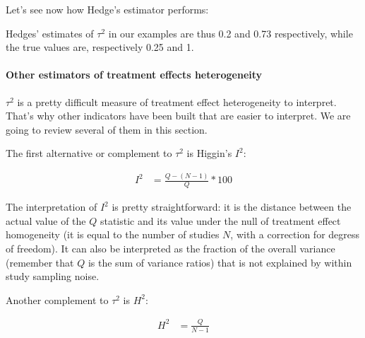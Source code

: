 \documentclass[]{book}
\newenvironment{Shaded}{\begin{snugshade}}{\end{snugshade}}
\newcommand{\DecValTok}[1]{\textcolor[rgb]{0.00,0.00,0.81}{#1}}
\newcommand{\FloatTok}[1]{\textcolor[rgb]{0.00,0.00,0.81}{#1}}
\newcommand{\KeywordTok}[1]{\textcolor[rgb]{0.13,0.29,0.53}{\textbf{#1}}}
\newcommand{\NormalTok}[1]{#1}
\newcommand{\OperatorTok}[1]{\textcolor[rgb]{0.81,0.36,0.00}{\textbf{#1}}}
\newcommand{\StringTok}[1]{\textcolor[rgb]{0.31,0.60,0.02}{#1}}
\let\oldparagraph\paragraph
\renewcommand{\paragraph}[1]{\oldparagraph{#1}\mbox{}}
\theoremstyle{definition}
\theoremstyle{definition}
\theoremstyle{definition}
\theoremstyle{remark}
\begin{document}
Let's see now how Hedge's estimator performs:

\begin{Shaded}
\end{Shaded}

Hedges' estimates of \(\tau^2\) in our examples are thus 0.2 and 0.73 respectively, while the true values are, respectively 0.25 and 1.

\hypertarget{other-estimators-of-treatment-effects-heterogeneity}{%
\paragraph{Other estimators of treatment effects heterogeneity}\label{other-estimators-of-treatment-effects-heterogeneity}}

\(\tau^2\) is a pretty difficult measure of treatment effect heterogeneity to interpret.
That's why other indicators have been built that are easier to interpret.
We are going to review several of them in this section.

The first alternative or complement to \(\tau^2\) is Higgin's \(I^2\):

\begin{align*}
  I^2 & = \frac{Q-(N-1)}{Q}*100
\end{align*}

The interpretation of \(I^2\) is pretty straightforward: it is the distance between the actual value of the \(Q\) statistic and its value under the null of treatment effect homogeneity (it is equal to the number of studies \(N\), with a correction for degress of freedom).
It can also be interpreted as the fraction of the overall variance (remember that \(Q\) is the sum of variance ratios) that is not explained by within study sampling noise.

Another complement to \(\tau^2\) is \(H^2\):

\begin{align*}
  H^2 & = \frac{Q}{N-1}
\end{align*}
\end{document}
